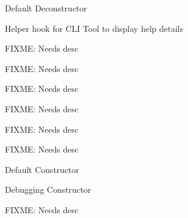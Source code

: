 \begin{DoxyRefList}
%
Default Deconstructor  
\item[Member \mbox{\hyperlink{classHelpSuite_ae0f3c1a652bbb4f4817ad0c25fa14452}{Help\+Suite\+::\+\_\+help}} ()]\label{todo__todo000147}%
%
Helper hook for CLI Tool to display help details  
\item[Member \mbox{\hyperlink{classHelpSuite_a83d8aceeefa33fe8b985464754cb51c6}{Help\+Suite\+::Actor\+Help}} ()]\label{todo__todo000137}%
%
FIXME\+: Needs desc  
\item[Member \mbox{\hyperlink{classHelpSuite_ae4213d0430b7b36d2fe0f27c3144c8d7}{Help\+Suite\+::Balance\+Help}} ()]\label{todo__todo000138}%
%
FIXME\+: Needs desc  
\item[Member \mbox{\hyperlink{classHelpSuite_a122d302a4cbac4efb6760ef36d8a3c26}{Help\+Suite\+::Battle\+Help}} ()]\label{todo__todo000139}%
%
FIXME\+: Needs desc  
\item[Member \mbox{\hyperlink{classHelpSuite_aa41bfd0020e7900df15f3149269d2a63}{Help\+Suite\+::Clock\+Help}} ()]\label{todo__todo000140}%
%
FIXME\+: Needs desc  
\item[Member \mbox{\hyperlink{classHelpSuite_a77fff93a8852e6feaf895236b18316b1}{Help\+Suite\+::Combat\+Help}} ()]\label{todo__todo000141}%
%
FIXME\+: Needs desc  
\item[Member \mbox{\hyperlink{classHelpSuite_a822e14c21f359c93ee97774ac58a48a7}{Help\+Suite\+::Help\+All}} ()]\label{todo__todo000136}%
%
FIXME\+: Needs desc  
\item[Member \mbox{\hyperlink{classHelpSuite_ad859c688219b1c5a9be784824ebf6ee3}{Help\+Suite\+::Help\+Suite}} ()]\label{todo__todo000134}%
%
Default Constructor  
\item[Member \mbox{\hyperlink{classHelpSuite_a63ce00b20708ab06e62f8cb0061ad47e}{Help\+Suite\+::Help\+Suite}} (bool)]\label{todo__todo000135}%
%
Debugging Constructor  
\item[Member \mbox{\hyperlink{classHelpSuite_a99a150e13f33c718cf26c1b2f762e436}{Help\+Suite\+::Item\+Help}} ()]\label{todo__todo000142}%
%
FIXME\+: Needs desc  
\item[Member \mbox{\hyperlink{classHelpSuite_a70a993324427fd4747ed9e2457e61d16}{Help\+Suite\+::Player\+Help}} ()]\label{todo__todo000143}%
%

\end{DoxyRefList}
